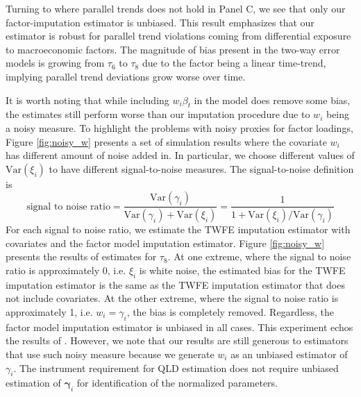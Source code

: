 \documentclass[12pt]{article}
\begin{document}
Turning to where parallel trends does not hold in Panel C, we see that only our factor-imputation estimator is unbiased. This result emphasizes that our estimator is robust for parallel trend violations coming from differential exposure to macroeconomic factors. The magnitude of bias present in the two-way error models is growing from $\tau_6$ to $\tau_8$ due to the factor being a linear time-trend, implying parallel trend deviations grow worse over time. 

It is worth noting that while including $w_i \beta_t$ in the model does remove some bias, the estimates still perform worse than our imputation procedure due to $w_i$ being a noisy measure. To highlight the problems with noisy proxies for factor loadings, Figure \ref{fig:noisy_w} presents a set of simulation results where the covariate $w_i$ has different amount of noise added in. In particular, we choose different values of $\text{Var}(\xi_i)$ to have different signal-to-noise measures. The signal-to-noise definition is 
\begin{equation}
\text{signal to noise ratio} = \frac{\text{Var}(\gamma_i)}{\text{Var}(\gamma_i) + \text{Var}(\xi_i)} = \frac{1}{1 + \text{Var}(\xi_i) / \text{Var}(\gamma_i)}
\end{equation}
For each signal to noise ratio, we estimate the TWFE imputation estimator with covariates and the factor model imputation estimator. Figure \ref{fig:noisy_w} presents the results of estimates for $\tau_8$. At one extreme, where the signal to noise ratio is approximately 0, i.e. $\xi_i$ is white noise, the estimated bias for the TWFE imputation estimator is the same as the TWFE imputation estimator that does not include covariates. At the other extreme, where the signal to noise ratio is approximately 1, i.e. $w_i = \gamma_i$, the bias is completely removed. Regardless, the factor model imputation estimator is unbiased in all cases. This experiment echos the results of \citet{kejriwal2021efficacy}. However, we note that our results are still generous to estimators that use such noisy measure because we generate $w_i$ as an unbiased estimator of $\gamma_i$. The instrument requirement for QLD estimation does not require unbiased estimation of $\bm \gamma_i$ for identification of the normalized parameters.
\end{document}
